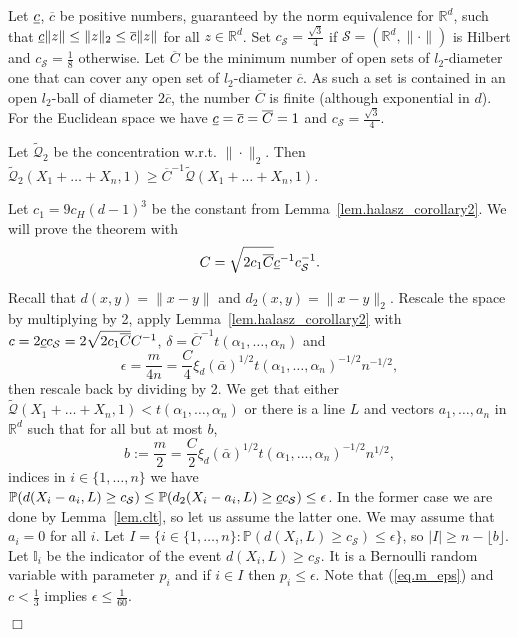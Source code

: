 \documentclass{article}
\newenvironment{proofof}[1]{\noindent {\bf Proof of #1}}{\hspace*{\fill}$\Box$}
\newcommand{\pr}{\mathbb P}
\newcommand{\concdiam}{\tilde{\mathcal{Q}}}
\begin{document}
\medskip

\begin{proofof}{Theorem~\ref{thm.main}}
    Let $\underbar{$c$}$, $\overline{c}$ be positive numbers, guaranteed by the norm equivalence for $\mathbb{R}^d$, such that $\underbar{$c$} \|z\| \le \|z\|_2 \le \overline{c} \|z\|$ for all $z \in \mathbb{R}^d$. Set $c_{\mathcal{S}} = \frac {\sqrt 3} 4$ if $\mathcal{S}=(\mathbb{R}^d, \|\cdot\|)$ is Hilbert and $c_{\mathcal{S}} = \frac 1 8$ otherwise. Let $\overline{C}$ be the minimum number of open sets of $l_2$-diameter one that can cover any open set of $l_2$-diameter $\overline{c}$. As such a set is contained in an open $l_2$-ball of diameter $2 \overline{c}$, the number $\overline{C}$ is finite (although exponential in $d$).
    For the Euclidean space we have $\underbar{$c$} = \overline{c} = \overline{C} = 1$ and $c_{\mathcal{S}}=\frac {\sqrt 3} 4$.
    
    Let $\concdiam_2$ be the concentration w.r.t. $\|\cdot\|_2$.
    Then $\concdiam_2(X_1 + \dots + X_n, 1) \ge \overline{C}^{-1} \concdiam(X_1 + \dots + X_n, 1)$.

    Let $c_1 = 9 c_H (d-1)^3$ be the constant from Lemma~\ref{lem.halasz_corollary2}.
    We will prove the theorem with
    \begin{equation}\label{eq.defbigC}
        C = \sqrt{2c_1 \overline{C}} \underbar{$c$}^{-1}  c_{\mathcal S}^{-1}.
    \end{equation}


    Recall that $d(x,y) = \|x-y\|$ and $d_2(x,y) = \|x-y\|_2$.
    Rescale the space by multiplying by 2, apply Lemma~\ref{lem.halasz_corollary2} with $c = 2 \underbar{$c$} c_{\mathcal{S}} = 2 \sqrt{2 c_1 \overline{C}} C^{-1}$, $\delta =  \overline{C}^{-1} t(\alpha_1, \dots, \alpha_n)$ and
    \[
        \epsilon = \frac {m} {4 n} = \frac C 4 \xi_d(\bar{\alpha})^{1/2} t(\alpha_1, \dots, \alpha_n)^{-1/2} n^{-1/2},
    \]
    then rescale back by dividing by 2. We get that either $\concdiam(X_1 + \dots + X_n, 1) < t(\alpha_1, \dots, \alpha_n)$ or there is a line $L$ and vectors $a_1, \dots, a_n$ in $\mathbb{R}^d$ such that for all but at most $b$, 
    \[
        b := \frac {m} 2 = \frac {C} {2} \xi_d(\bar{\alpha})^{1/2} t(\alpha_1, \dots, \alpha_n)^{-1/2} n^{1/2},
    \]
    indices in $i \in \{1,\dots, n\}$ we have $\pr(d(X_i - a_i, L) \ge c_{\mathcal{S}}) \le \pr(d_2(X_i - a_i, L) \ge \underbar{$c$} c_{\mathcal{S}}) \le \epsilon$. In the former case we are done by Lemma~\ref{lem.clt}, so let us assume the latter one. We may assume that $a_i=0$ for all $i$.
    Let $I = \{i \in \{1, \dots, n\}: \pr(d(X_i, L) \ge c_{\mathcal{S}}) \le \epsilon\}$, so $|I| \ge n - \lfloor b \rfloor$. 
Let $\mathbb{I}_i$ be the indicator of the event $d(X_i, L) \ge c_{\mathcal{S}}$.
It is a Bernoulli random variable
    with parameter $p_i$ and if $i \in I$ then $p_i \le \epsilon$.
    Note that (\ref{eq.m_eps}) and $c < \frac 1 3$ implies $\epsilon \le \frac 1 {60}$. 


\end{proofof}
\end{document}
